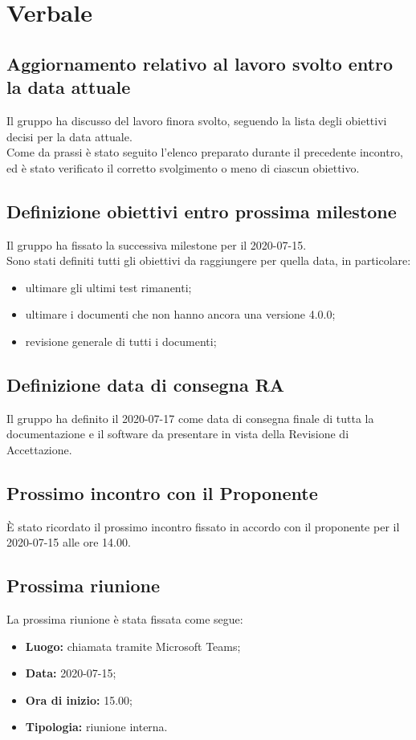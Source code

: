 \section{Verbale}

	\subsection{Aggiornamento relativo al lavoro svolto entro la data attuale}
	Il gruppo ha discusso del lavoro finora svolto, seguendo la lista degli obiettivi decisi per la data attuale. \\
	Come da prassi è stato seguito l'elenco preparato durante il precedente incontro, ed è stato verificato il corretto svolgimento o meno di ciascun obiettivo.
	
	\subsection{Definizione obiettivi entro prossima milestone}
		Il gruppo ha fissato la successiva milestone per il 2020-07-15.\\
		Sono stati definiti tutti gli obiettivi da raggiungere per quella data, in particolare:
		\begin{itemize}
			\item ultimare gli ultimi test rimanenti;
			\item ultimare i documenti che non hanno ancora una versione 4.0.0;
			\item revisione generale di tutti i documenti;
		\end{itemize}
	
	\subsection{Definizione data di consegna RA}
		Il gruppo ha definito il 2020-07-17 come data di consegna finale di tutta la documentazione e il software da presentare in vista della Revisione di Accettazione.
		
	\subsection{Prossimo incontro con il Proponente}
		È stato ricordato il prossimo incontro fissato in accordo con il proponente per il 2020-07-15 alle ore 14.00.
	
	\subsection{Prossima riunione}
		La prossima riunione è stata fissata come segue:
		\begin{itemize}
			\item \textbf{Luogo:} chiamata tramite Microsoft Teams; 
			\item \textbf{Data:} 2020-07-15;
			\item \textbf{Ora di inizio:} 15.00;
			\item \textbf{Tipologia:} riunione interna.
		\end{itemize}